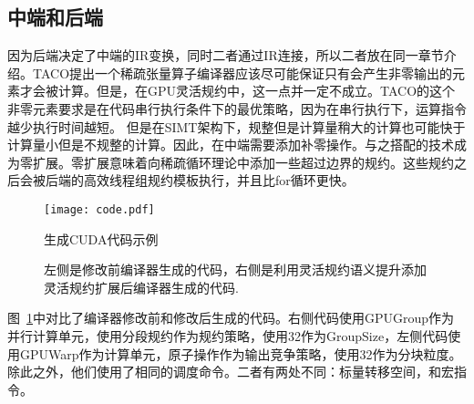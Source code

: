 \subsection{中端和后端}
因为后端决定了中端的IR变换，同时二者通过IR连接，所以二者放在同一章节介绍。TACO提出一个稀疏张量算子编译器应该尽可能保证只有会产生非零输出的元素才会被计算。但是，在GPU灵活规约中，这一点并一定不成立。TACO的这个非零元素要求是在代码串行执行条件下的最优策略，因为在串行执行下，运算指令越少执行时间越短。
但是在SIMT架构下，规整但是计算量稍大的计算也可能快于计算量小但是不规整的计算。因此，在中端需要添加补零操作。与之搭配的技术成为零扩展。零扩展意味着向稀疏循环理论中添加一些超过边界的规约。这些规约之后会被后端的高效线程组规约模板执行，并且比for循环更快。
\begin{figure}[h]%
  \centering
  \texttt{[image: code.pdf]}
  \caption{生成CUDA代码示例}
  \caption*{左侧是修改前编译器生成的代码，右侧是利用灵活规约语义提升添加灵活规约扩展后编译器生成的代码.}\label{fig:code-example}
\end{figure}
图~\ref{fig:code-example}中对比了编译器修改前和修改后生成的代码。右侧代码使用GPUGroup作为并行计算单元，使用分段规约作为规约策略，使用32作为GroupSize，左侧代码使用GPUWarp作为计算单元，原子操作作为输出竞争策略，使用32作为分块粒度。除此之外，他们使用了相同的调度命令。二者有两处不同：标量转移空间，和宏指令。

